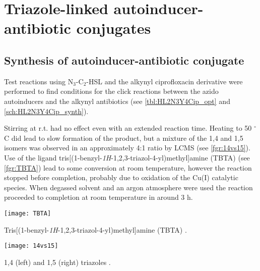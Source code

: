 \section{Triazole-linked autoinducer-antibiotic conjugates}

\subsection{Synthesis of autoinducer-antibiotic conjugate }

Test reactions using N$_3$-C$_2$-HSL  and the alkynyl ciprofloxacin derivative  were performed to find conditions for the click reactions between the azido autoinducers and the alkynyl antibiotics (see \ref{tbl:HL2N3Y4Cip_opt} and \ref{sch:HL2N3Y4Cip_synth}). 

Stirring at r.t. had no effect even with an extended reaction time. Heating to 50 $^{\circ}$C did lead to slow formation of the product, but a mixture of the 1,4  and 1,5  isomers was observed in an approximately 4:1 ratio by LCMS (see \ref{fgr:14vs15}). Use of the ligand tris[(1-benzyl-\textit{1H}-1,2,3-triazol-4-yl)methyl]amine (TBTA)  (see \ref{fgr:TBTA}) lead to some conversion at room temperature, however the reaction stopped before completion, probably due to oxidation of the Cu(I) catalytic species. When degassed solvent and an argon atmosphere were used the reaction proceeded to completion at room temperature in around 3 h.

\begin{scheme}[H]
	\begin{center}
		\texttt{[image: TBTA]}
		\caption{Tris[(1-benzyl-\textit{1H}-1,2,3-triazol-4-yl)methyl]amine (TBTA)  .\label{fgr:TBTA}}
	\end{center}
\end{scheme}

\begin{scheme}[H]
	\begin{center}
		\texttt{[image: 14vs15]}
		\caption{1,4 (left) and 1,5 (right) triazoles .\label{fgr:14vs15}}
	\end{center}
\end{scheme}

